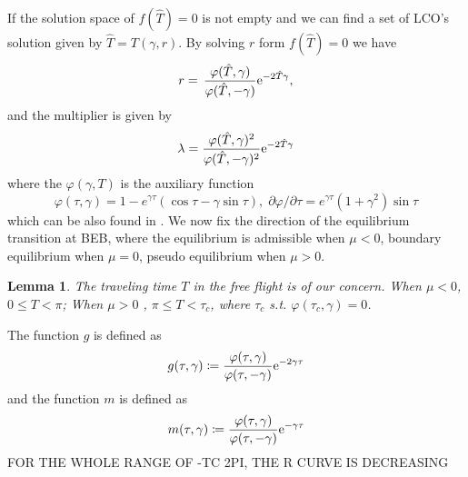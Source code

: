\documentclass{article}
\newtheorem{lemma}[theorem]{Lemma}
\begin{document}
If the solution space of $f(\hat{T}) =0 $ is not empty and we can find a set of LCO's solution given by 
$\hat{T} = T(\gamma, r)$.
By solving $r$ form $f(\hat{T}) =0$  we have 
\begin{equation}
	r =\, \frac{\varphi(\hat{T}, \gamma)}{\varphi(\hat{T}, -\gamma)}  {\rm e}^{-2 \hat{T} \gamma},
	\label{eq:r_value_cond}
\end{equation}
and the multiplier is given by 
\begin{equation}
	\lambda = \frac{\varphi(\hat{T},\gamma)^2}{\varphi(\hat{T}, -\gamma)^2}  {\rm e}^{-2 \hat{T} \gamma} 
\end{equation}
where the $\varphi(\gamma,T)$ is  the auxiliary function
\begin{equation}
	\varphi(\tau,\gamma)=1- e^{\gamma \tau}(\cos{\tau}-\gamma\sin{\tau}), 
	\; \partial \varphi/\partial{\tau}=e^{\gamma\tau}(1+\gamma^2)\sin{\tau}
\end{equation}
which can be also found in \cite{ANDRONOV1966443}.
%
We now fix the direction of the equilibrium transition at BEB, where the equilibrium is admissible when $\mu < 0$, boundary equilibrium when $\mu = 0$, pseudo equilibrium when $\mu >0$.
\begin{lemma}
	The traveling time $T$ in the free flight is of our concern.
	When $\mu <0$, $0 \leq T < \pi$;
When $\mu>0$ , $\pi \leq T< \tau_c$, where $\tau_c$ s.t. $\varphi(\tau_c, \gamma) =0$.
\end{lemma}
The function $g$ is defined as
\begin{equation}
\label{eq:def_of_r}
g(\tau,\gamma) \coloneq \frac{\varphi(\tau, \gamma)}{\varphi(\tau, -\gamma)}  {\rm e}^{-2 \gamma \tau}
\end{equation}
and the function $m$ is defined as 
\begin{equation}
	\label{eq:def_of_mp}
	m(\tau,\gamma) \coloneq \frac{\varphi(\tau, \gamma)}{\varphi(\tau, -\gamma)}  {\rm e}^{- \gamma \tau}
\end{equation}
FOR THE WHOLE RANGE OF -TC 2PI, THE R CURVE IS DECREASING
\end{document}
